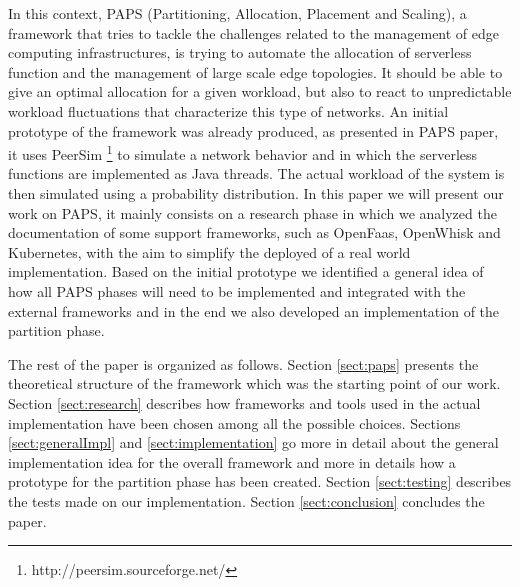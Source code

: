 In this context, PAPS (Partitioning, Allocation, Placement and Scaling), a framework that tries to
tackle the challenges related to the management of edge computing infrastructures,
is trying to automate the allocation of serverless function and the management of large scale edge topologies.
It should be able to give an optimal allocation for a given workload, but also
to react to unpredictable workload fluctuations that characterize this type of networks.
An initial prototype of the framework was already produced, as presented in PAPS \cite{PAPS} paper,
it uses PeerSim \footnote{ http://peersim.sourceforge.net/} to simulate a network behavior and in which
the serverless functions are implemented as Java threads. The actual workload of the system is then simulated
using a probability distribution.
In this paper we will present our work on PAPS, it mainly consists on a research phase in which we
analyzed the documentation of some support frameworks, such as OpenFaas, OpenWhisk and Kubernetes, with the
aim to simplify the deployed of a real world implementation. Based on the initial prototype we identified a
general idea of how all PAPS phases will need to be implemented and integrated with the external frameworks and
in the end we also developed an implementation of the partition phase.

The rest of the paper is organized as follows. Section \ref{sect:paps} presents the theoretical structure of the
framework which was the starting point of our work. Section \ref{sect:research} describes how frameworks and tools
used in the actual implementation have been chosen among all the possible choices. Sections \ref{sect:generalImpl}
and \ref{sect:implementation} go more in detail about the general implementation idea for the overall framework and
more in details how a prototype for the partition phase has been created. Section \ref{sect:testing} describes the tests
made on our implementation. Section \ref{sect:conclusion} concludes the paper.
